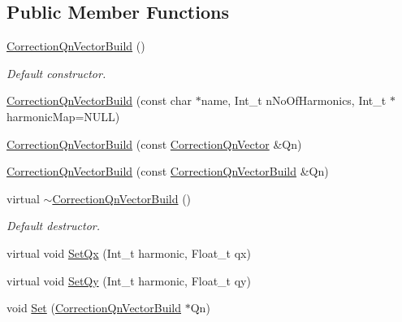 \subsection*{Public Member Functions}
\begin{DoxyCompactItemize}
\item 
\mbox{\label{classQn_1_1CorrectionQnVectorBuild_a5c7b5d7cf75717b55b5ca94b3366523b}} 
\mbox{\hyperlink{classQn_1_1CorrectionQnVectorBuild_a5c7b5d7cf75717b55b5ca94b3366523b}{Correction\+Qn\+Vector\+Build}} ()
\begin{DoxyCompactList}\small\item\em Default constructor. \end{DoxyCompactList}\item 
\mbox{\hyperlink{classQn_1_1CorrectionQnVectorBuild_a1f70d2bb07fe175a4aef27105f28429b}{Correction\+Qn\+Vector\+Build}} (const char $\ast$name, Int\+\_\+t n\+No\+Of\+Harmonics, Int\+\_\+t $\ast$harmonic\+Map=N\+U\+LL)
\item 
\mbox{\hyperlink{classQn_1_1CorrectionQnVectorBuild_a14c8e4495564ffd8250e4a90a9c4dae3}{Correction\+Qn\+Vector\+Build}} (const \mbox{\hyperlink{classQn_1_1CorrectionQnVector}{Correction\+Qn\+Vector}} \&Qn)
\item 
\mbox{\hyperlink{classQn_1_1CorrectionQnVectorBuild_ad75a0f924ed622ab07cbba8979917e91}{Correction\+Qn\+Vector\+Build}} (const \mbox{\hyperlink{classQn_1_1CorrectionQnVectorBuild}{Correction\+Qn\+Vector\+Build}} \&Qn)
\item 
\mbox{\label{classQn_1_1CorrectionQnVectorBuild_ae4fea8e067dc5d8716ada23badb13261}} 
virtual \mbox{\hyperlink{classQn_1_1CorrectionQnVectorBuild_ae4fea8e067dc5d8716ada23badb13261}{$\sim$\+Correction\+Qn\+Vector\+Build}} ()
\begin{DoxyCompactList}\small\item\em Default destructor. \end{DoxyCompactList}\item 
virtual void \mbox{\hyperlink{classQn_1_1CorrectionQnVectorBuild_af4db1f1b7fc5650c39d3a3f232c184cf}{Set\+Qx}} (Int\+\_\+t harmonic, Float\+\_\+t qx)
\item 
virtual void \mbox{\hyperlink{classQn_1_1CorrectionQnVectorBuild_a1b9a7e2b0eafc48de05a2f90fcc51fb6}{Set\+Qy}} (Int\+\_\+t harmonic, Float\+\_\+t qy)
\item 
void \mbox{\hyperlink{classQn_1_1CorrectionQnVectorBuild_a07c8702ae5903f064a3fd53496f195cb}{Set}} (\mbox{\hyperlink{classQn_1_1CorrectionQnVectorBuild}{Correction\+Qn\+Vector\+Build}} $\ast$Qn)

\end{DoxyCompactItemize}
